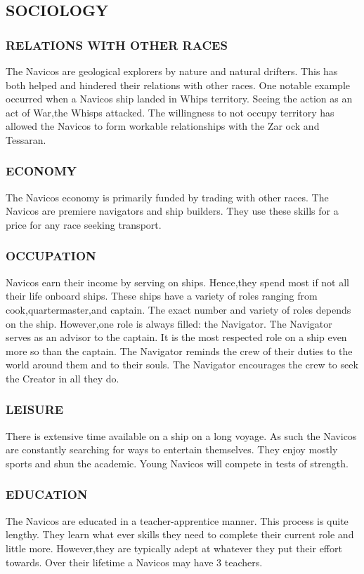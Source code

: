 \subsection{SOCIOLOGY}
\subsubsection{RELATIONS WITH OTHER RACES}
The Navicos are geological explorers by nature and natural drifters.  This has both helped and hindered their relations with other races.  One notable example occurred when a Navicos ship landed in Whips territory.  Seeing the action as an act of War,the Whisps attacked.  The willingness to not occupy territory has allowed the Navicos to form workable relationships with the Zar ock and Tessaran.
\subsubsection{ECONOMY}
The Navicos economy is primarily funded by trading with other races.  The Navicos are premiere navigators and ship builders.  They use these skills for a price for any race seeking transport.
\subsubsection{OCCUPATION}
Navicos earn their income by serving on ships.  Hence,they spend most if not all their life onboard ships.  These ships have a variety of roles ranging from cook,quartermaster,and captain.  The exact number and variety of roles depends on the ship.  However,one role is always filled: the Navigator.  The Navigator serves as an advisor to the captain.  It is the most respected role on a ship even more so than the captain.  The Navigator reminds the crew of their duties to the world around them and to their souls.  The Navigator encourages the crew to seek the Creator in all they do.
\subsubsection{LEISURE}
There is extensive time available on a ship on a long voyage.  As such the Navicos are constantly searching for ways to entertain themselves.  They enjoy mostly sports and shun the academic.  Young Navicos will compete in tests of strength.  
\subsubsection{EDUCATION}
The Navicos are educated in a teacher-apprentice manner.  This process is quite lengthy.  They learn what ever skills they need to complete their current role and little more.  However,they are typically adept at whatever they put their effort towards.  Over their lifetime a Navicos may have 3 teachers.
